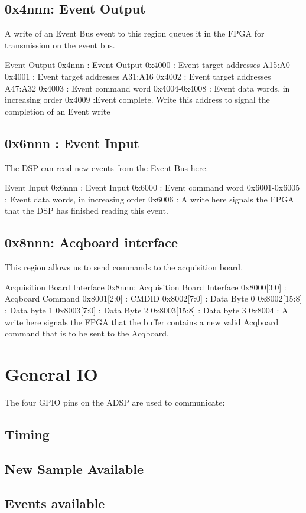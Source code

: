 \subsection{0x4nnn: Event Output} 
A write of an Event Bus event to this region queues it in the FPGA for
transmission on the event bus.

\begin{memmap}{Event Output}
0x4nnn : Event Output
0x4000 : Event target addresses A15:A0
0x4001 : Event target addresses A31:A16 
0x4002 : Event target addresses A47:A32
0x4003 : Event command word
0x4004-0x4008 : Event data words, in increasing order
0x4009 :Event complete. Write this address to signal the completion of an Event write
\end{memmap}

\subsection{0x6nnn : Event Input}
The DSP can read new events from the Event Bus here. 

\begin{memmap}{Event Input}
0x6nnn : Event Input
0x6000 : Event command word
0x6001-0x6005 :  Event data words, in increasing order
0x6006 : A write here signals the FPGA that the DSP has finished reading this event.
\end{memmap}

\subsection{0x8nnn: Acqboard interface}
This region allows us to send commands to the acquisition board. 

\begin{memmap}{Acquisition Board Interface}
0x8nnn: Acquisition Board Interface
0x8000[3:0] : Acqboard Command 
0x8001[2:0] : CMDID 
0x8002[7:0] : Data Byte 0 
0x8002[15:8] : Data byte 1 
0x8003[7:0] : Data Byte 2 
0x8003[15:8] : Data byte 3 
0x8004 : A write here signals the FPGA that the buffer contains a new valid Acqboard command that is to be sent to the Acqboard.
\end{memmap}

\section{General IO}

The four GPIO pins on the ADSP are used to communicate:

\subsection{Timing}

\subsection{New Sample Available}

\subsection{Events available}
